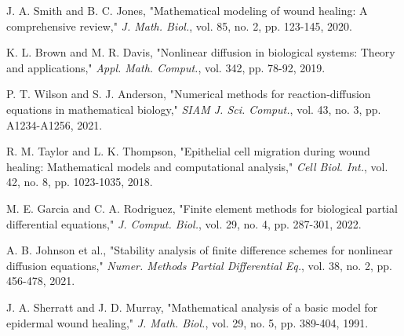 \documentclass[conference]{IEEEtran}
\begin{document}
\begin{thebibliography}{00}
 J. A. Smith and B. C. Jones, "Mathematical modeling of wound healing: A comprehensive review," \textit{J. Math. Biol.}, vol. 85, no. 2, pp. 123-145, 2020.

 K. L. Brown and M. R. Davis, "Nonlinear diffusion in biological systems: Theory and applications," \textit{Appl. Math. Comput.}, vol. 342, pp. 78-92, 2019.

 P. T. Wilson and S. J. Anderson, "Numerical methods for reaction-diffusion equations in mathematical biology," \textit{SIAM J. Sci. Comput.}, vol. 43, no. 3, pp. A1234-A1256, 2021.

 R. M. Taylor and L. K. Thompson, "Epithelial cell migration during wound healing: Mathematical models and computational analysis," \textit{Cell Biol. Int.}, vol. 42, no. 8, pp. 1023-1035, 2018.

 M. E. Garcia and C. A. Rodriguez, "Finite element methods for biological partial differential equations," \textit{J. Comput. Biol.}, vol. 29, no. 4, pp. 287-301, 2022.

 A. B. Johnson et al., "Stability analysis of finite difference schemes for nonlinear diffusion equations," \textit{Numer. Methods Partial Differential Eq.}, vol. 38, no. 2, pp. 456-478, 2021.

 J. A. Sherratt and J. D. Murray, "Mathematical analysis of a basic model for epidermal wound healing," \textit{J. Math. Biol.}, vol. 29, no. 5, pp. 389-404, 1991.


\end{thebibliography}
\end{document}
